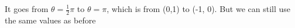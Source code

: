 \documentclass[preview]{standalone}
\begin{document}
\begin{center}
It goes from $\theta = \frac{1}{2} \pi$ to $\theta = \pi$, which is from (0,1) to (-1, 0). But we can still use the same values as before
\end{center}
\end{document}
